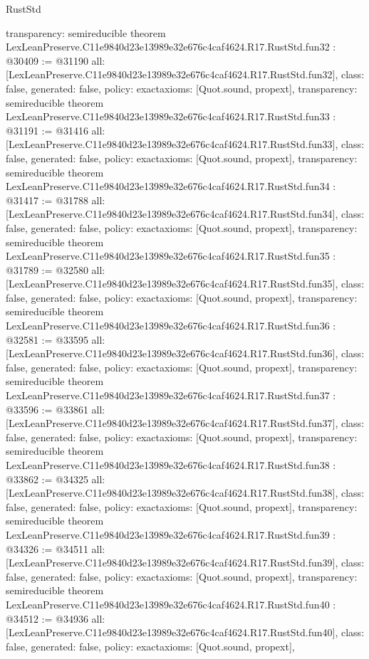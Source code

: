 \begin{lexlean}{RustStd}
\begin{coremodule}
{  transparency: semireducible
}
theorem LexLeanPreserve.C11e9840d23e13989e32e676c4caf4624.R17.RustStd.fun32 : @30409 := @31190 {
  all: [LexLeanPreserve.C11e9840d23e13989e32e676c4caf4624.R17.RustStd.fun32],
  class: false,
  generated: false,
  policy: exact{axioms: [Quot.sound, propext]},
  transparency: semireducible
}
theorem LexLeanPreserve.C11e9840d23e13989e32e676c4caf4624.R17.RustStd.fun33 : @31191 := @31416 {
  all: [LexLeanPreserve.C11e9840d23e13989e32e676c4caf4624.R17.RustStd.fun33],
  class: false,
  generated: false,
  policy: exact{axioms: [Quot.sound, propext]},
  transparency: semireducible
}
theorem LexLeanPreserve.C11e9840d23e13989e32e676c4caf4624.R17.RustStd.fun34 : @31417 := @31788 {
  all: [LexLeanPreserve.C11e9840d23e13989e32e676c4caf4624.R17.RustStd.fun34],
  class: false,
  generated: false,
  policy: exact{axioms: [Quot.sound, propext]},
  transparency: semireducible
}
theorem LexLeanPreserve.C11e9840d23e13989e32e676c4caf4624.R17.RustStd.fun35 : @31789 := @32580 {
  all: [LexLeanPreserve.C11e9840d23e13989e32e676c4caf4624.R17.RustStd.fun35],
  class: false,
  generated: false,
  policy: exact{axioms: [Quot.sound, propext]},
  transparency: semireducible
}
theorem LexLeanPreserve.C11e9840d23e13989e32e676c4caf4624.R17.RustStd.fun36 : @32581 := @33595 {
  all: [LexLeanPreserve.C11e9840d23e13989e32e676c4caf4624.R17.RustStd.fun36],
  class: false,
  generated: false,
  policy: exact{axioms: [Quot.sound, propext]},
  transparency: semireducible
}
theorem LexLeanPreserve.C11e9840d23e13989e32e676c4caf4624.R17.RustStd.fun37 : @33596 := @33861 {
  all: [LexLeanPreserve.C11e9840d23e13989e32e676c4caf4624.R17.RustStd.fun37],
  class: false,
  generated: false,
  policy: exact{axioms: [Quot.sound, propext]},
  transparency: semireducible
}
theorem LexLeanPreserve.C11e9840d23e13989e32e676c4caf4624.R17.RustStd.fun38 : @33862 := @34325 {
  all: [LexLeanPreserve.C11e9840d23e13989e32e676c4caf4624.R17.RustStd.fun38],
  class: false,
  generated: false,
  policy: exact{axioms: [Quot.sound, propext]},
  transparency: semireducible
}
theorem LexLeanPreserve.C11e9840d23e13989e32e676c4caf4624.R17.RustStd.fun39 : @34326 := @34511 {
  all: [LexLeanPreserve.C11e9840d23e13989e32e676c4caf4624.R17.RustStd.fun39],
  class: false,
  generated: false,
  policy: exact{axioms: [Quot.sound, propext]},
  transparency: semireducible
}
theorem LexLeanPreserve.C11e9840d23e13989e32e676c4caf4624.R17.RustStd.fun40 : @34512 := @34936 {
  all: [LexLeanPreserve.C11e9840d23e13989e32e676c4caf4624.R17.RustStd.fun40],
  class: false,
  generated: false,
  policy: exact{axioms: [Quot.sound, propext]},
}
\end{coremodule}
\end{lexlean}
